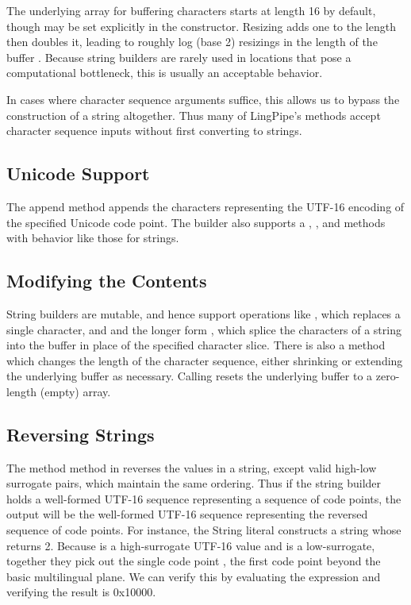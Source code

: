 The underlying array for buffering characters starts at length 16 by
default, though may be set explicitly in the constructor.  Resizing
adds one to the length then doubles it, leading to roughly log (base
2) resizings in the length of the buffer .  Because string builders are rarely used in locations
that pose a computational bottleneck, this is usually an acceptable
behavior.

In cases where character sequence arguments suffice, this allows us to
bypass the construction of a string altogether.  Thus many of
LingPipe's methods accept character sequence inputs without first
converting to strings.

\subsection{Unicode Support}

The append method  appends the characters
representing the UTF-16 encoding of the specified Unicode code point.
The builder also supports a , ,
and  methods with behavior like those for strings.

\subsection{Modifying the Contents}

String builders are mutable, and hence support operations like
, which replaces a single character, and
 and the longer form
, which splice the characters of a
string into the buffer in place of the specified character slice.
There is also a  method which changes the length
of the character sequence, either shrinking or extending the underlying
buffer as necessary.  Calling  resets
the underlying buffer to a zero-length (empty) array.

\subsection{Reversing Strings}

The method  method in  reverses
the  values in a string, except valid high-low surrogate
pairs, which maintain the same ordering.  Thus if the string builder
holds a well-formed UTF-16 sequence representing a sequence of code
points, the output will be the well-formed UTF-16 sequence
representing the reversed sequence of code points.  For instance, the
String literal  constructs a string whose
 returns 2.  Because  is a
high-surrogate UTF-16  value and  is a
low-surrogate, together they pick out the single code point
, the first code point beyond the basic multilingual
plane.  We can verify this by evaluating the expression
 and verifying the result 
is 0x10000.


